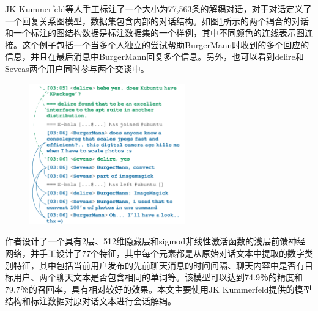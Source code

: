 JK Kummerfeld等人\cite{kummerfeld2018large}手工标注了一个大小为77,563条的解耦对话，对于对话定义了一个回复关系图模型，数据集包含内部的对话结构。如图\ref{fig:example-conversation}所示的两个耦合的对话和一个标注的图结构数据是标注数据集的一个样例，其中不同颜色的连线表示图连接。这个例子包括一个当多个人独立的尝试帮助BurgerMann时收到的多个回应的信息，并且在最后消息中BurgerMann回复多个信息。另外，也可以看到delire和Seveas两个用户同时参与两个交谈中。
\begin{figure}[htb]
    \centering
    \includegraphics[width=0.6\textwidth]{Img/example-conversation.png}
    \label{fig:example-conversation}
\end{figure}
作者设计了一个具有2层、512维隐藏层和sigmod非线性激活函数的浅层前馈神经网络，并手工设计了77个特征，其中每个元素都是从原始对话文本中提取的数字类别特征，其中包括当前用户发布的先前聊天消息的时间间隔、聊天内容中是否有目标用户、两个聊天文本是否包含相同的单词等。该模型可以达到74.9％的精度和79.7％的召回率，具有相对较好的效果。本文主要使用JK Kummerfeld提供的模型结构和标注数据对原对话文本进行会话解耦。

